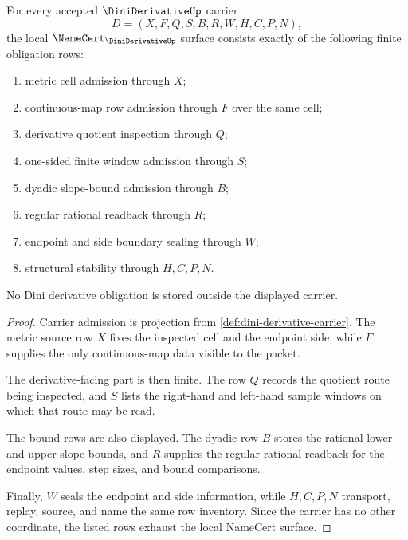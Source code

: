 \begin{theorem}
\label{thm:dini-derivative-namecert-obligations}
For every accepted $\DiniDerivativeUp$ carrier
$$
D=(X,F,Q,S,B,R,W,H,C,P,N),
$$
the local $\NameCert_{\DiniDerivativeUp}$ surface consists exactly of the following finite obligation rows:
\begin{enumerate}
\item metric cell admission through $X$;
\item continuous-map row admission through $F$ over the same cell;
\item derivative quotient inspection through $Q$;
\item one-sided finite window admission through $S$;
\item dyadic slope-bound admission through $B$;
\item regular rational readback through $R$;
\item endpoint and side boundary sealing through $W$;
\item structural stability through $H,C,P,N$.
\end{enumerate}
No Dini derivative obligation is stored outside the displayed carrier.
\end{theorem}
\begin{proof}
Carrier admission is projection from \autoref{def:dini-derivative-carrier}. The metric source row $X$ fixes the inspected cell and the endpoint side, while $F$ supplies the only continuous-map data visible to the packet.

The derivative-facing part is then finite. The row $Q$ records the quotient route being inspected, and $S$ lists the right-hand and left-hand sample windows on which that route may be read.

The bound rows are also displayed. The dyadic row $B$ stores the rational lower and upper slope bounds, and $R$ supplies the regular rational readback for the endpoint values, step sizes, and bound comparisons.

Finally, $W$ seals the endpoint and side information, while $H,C,P,N$ transport, replay, source, and name the same row inventory. Since the carrier has no other coordinate, the listed rows exhaust the local NameCert surface.
\end{proof}

